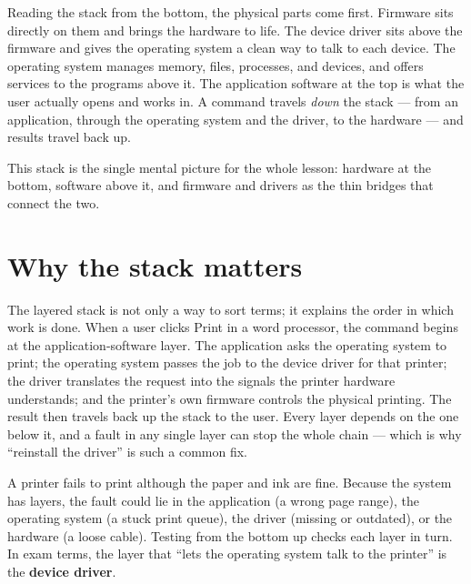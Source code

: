Reading the stack from the bottom, the physical parts come first. Firmware sits
directly on them and brings the hardware to life. The device driver sits above
the firmware and gives the operating system a clean way to talk to each device.
The operating system manages memory, files, processes, and devices, and offers
services to the programs above it. The application software at the top is what
the user actually opens and works in. A command travels \emph{down} the stack
--- from an application, through the operating system and the driver, to the
hardware --- and results travel back up.

This stack is the single mental picture for the whole lesson: hardware at the
bottom, software above it, and firmware and drivers as the thin bridges that
connect the two.

\section{Why the stack matters}
The layered stack is not only a way to sort terms; it explains the order in
which work is done. When a user clicks Print in a word processor, the command
begins at the application-software layer. The application asks the operating
system to print; the operating system passes the job to the device driver for
that printer; the driver translates the request into the signals the printer
hardware understands; and the printer's own firmware controls the physical
printing. The result then travels back up the stack to the user. Every layer
depends on the one below it, and a fault in any single layer can stop the
whole chain --- which is why ``reinstall the driver'' is such a common fix.

\begin{example}
A printer fails to print although the paper and ink are fine. Because the
system has layers, the fault could lie in the application (a wrong page range),
the operating system (a stuck print queue), the driver (missing or outdated),
or the hardware (a loose cable). Testing from the bottom up checks each layer
in turn. In exam terms, the layer that ``lets the operating system talk to the
printer'' is the \textbf{device driver}.
\end{example}

